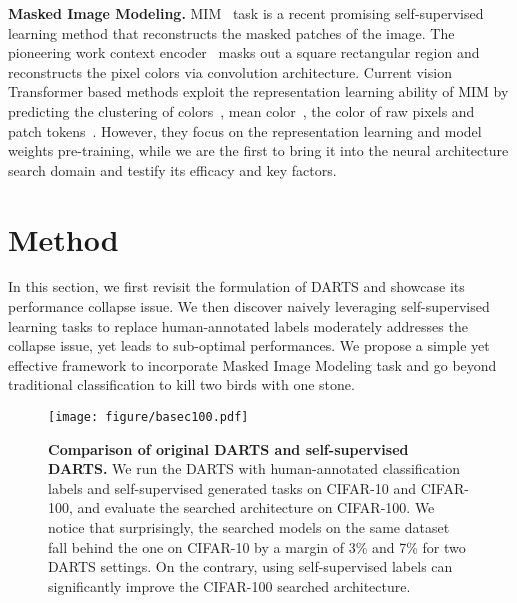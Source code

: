 \documentclass[10pt,twocolumn,letterpaper]{article}
\newcommand{\mypara}[1]{\vspace{1mm}\noindent\textbf{#1}}
\begin{document}
\mypara{Masked Image Modeling.}
MIM~\cite{Pathak_2016_Inpainting,He_2022_mae} task is a recent promising self-supervised learning method that reconstructs the masked patches of the image.
The pioneering work context encoder~\cite{Pathak_2016_Inpainting} masks out a square rectangular region and reconstructs the pixel colors via convolution architecture.
Current vision Transformer based methods exploit the representation learning ability of MIM by predicting the clustering of colors~\cite{chen_2020_igpt}, mean color~\cite{dosovitskiy2021vit}, the color of raw pixels\cite{He_2022_mae,Xie_2022_simmim} and patch tokens~\cite{bao2022beit}.
However, they focus on the representation learning and model weights pre-training,
while we are the first to bring it into the neural architecture search domain and testify its efficacy and key factors.
\vspace{-4pt} \section{Method}
\label{sec:methods}
\vspace{-4pt}
In this section, we first 
revisit the formulation of
DARTS and showcase its performance collapse issue.
We then discover naively leveraging self-supervised learning tasks to replace human-annotated labels moderately addresses the collapse issue,
yet leads to sub-optimal performances. We propose a simple yet effective framework to incorporate 
Masked Image Modeling
task and go beyond traditional classification to kill two birds with one stone.
\begin{figure}[t]
    \centering
     \texttt{[image: figure/basec100.pdf]}
     \vspace{-6pt}
     \caption{
    \textbf{Comparison of original DARTS and self-supervised DARTS. } 
    We run the DARTS with human-annotated classification labels and self-supervised generated tasks on CIFAR-10 and CIFAR-100, and evaluate the searched architecture on CIFAR-100. We notice that surprisingly, the searched models on the same dataset fall behind the one on CIFAR-10 by a margin of 3\% and 7\% for two DARTS settings. On the contrary, using self-supervised labels can significantly improve the CIFAR-100 searched architecture.
    }
     \label{fig:fig2}
     \vspace{-8pt}
  \end{figure}
\end{document}
